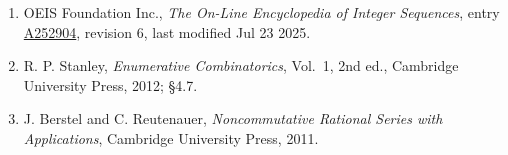 \documentclass[11pt]{article}
\theoremstyle{definition}
\begin{document}
\begin{enumerate}

\item OEIS Foundation Inc., \emph{The On-Line Encyclopedia of Integer Sequences}, entry \href{https://oeis.org/A252904}{A252904}, revision 6, last modified Jul 23 2025.

\item R. P. Stanley, \emph{Enumerative Combinatorics}, Vol.~1, 2nd ed., Cambridge University Press, 2012; \S4.7.

\item J. Berstel and C. Reutenauer, \emph{Noncommutative Rational Series with Applications}, Cambridge University Press, 2011.

\end{enumerate}
\end{document}
